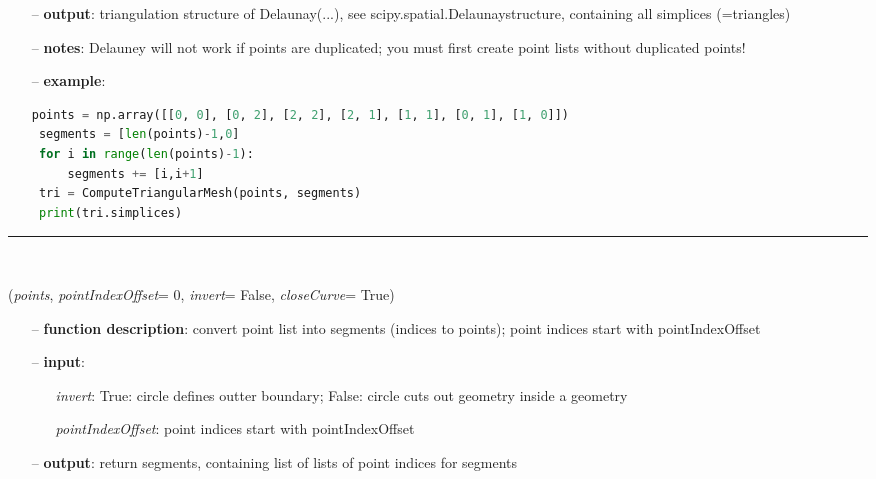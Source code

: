 \begin{itemize}[leftmargin=1.4cm]
\begin{itemize}[leftmargin=1.4cm]
\begin{itemize}[leftmargin=0.5cm]
\begin{itemize}[leftmargin=1.4cm]
\begin{itemize}[leftmargin=1.4cm]
\begin{itemize}[leftmargin=0.5cm]
\begin{itemize}[leftmargin=1.4cm]
\begin{itemize}[leftmargin=0.5cm]
\begin{itemize}[leftmargin=0.7cm]
  \item[--]  {\bf output}: triangulation structure of Delaunay(...), see scipy.spatial.Delaunaystructure, containing all simplices (=triangles)  \item[--]  {\bf notes}: Delauney will not work if points are duplicated; you must first create point lists without duplicated points!  \item[--]  {\bf example}: \vspace{-12pt}\ei\begin{lstlisting}[language=Python, xleftmargin=36pt]
points = np.array([[0, 0], [0, 2], [2, 2], [2, 1], [1, 1], [0, 1], [1, 0]])
 segments = [len(points)-1,0]
 for i in range(len(points)-1):
     segments += [i,i+1]
 tri = ComputeTriangularMesh(points, segments)
 print(tri.simplices)\end{lstlisting}\vspace{-24pt}\bi\item[]\vspace{-24pt}\vspace{12pt}\end{itemize}
%
\noindent\rule{8cm}{0.75pt}\vspace{1pt} \\ 
\begin{flushleft}
\label{sec:graphicsDataUtilities:SegmentsFromPoints}
({\it points}, {\it pointIndexOffset}= 0, {\it invert}= False, {\it closeCurve}= True)
\end{flushleft}
\setlength{\itemindent}{0.7cm}
\begin{itemize}[leftmargin=0.7cm]
  \item[--]  {\bf function description}: convert point list into segments (indices to points); point indices start with pointIndexOffset  \item[--]  {\bf input}: \vspace{-6pt}
  \begin{itemize}[leftmargin=1.2cm]
\setlength{\itemindent}{-0.7cm}
    \item[] {\it invert}: True: circle defines outter boundary; False: circle cuts out geometry inside a geometry
    \item[] {\it   pointIndexOffset}: point indices start with pointIndexOffset
  \end{itemize}
  \item[--]  {\bf output}: return segments, containing list of lists of point indices for segments\vspace{12pt}\end{itemize}

\end{itemize}
\end{itemize}
\end{itemize}
\end{itemize}
\end{itemize}
\end{itemize}
\end{itemize}
\end{itemize}
